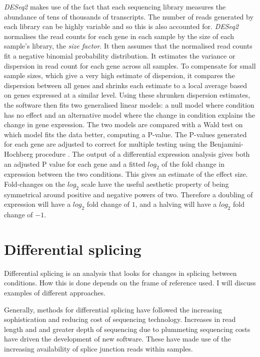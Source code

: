 \textit{DESeq2} makes use of the fact that each sequencing library measures the abundance of tens of thousands of transcripts. 
The number of reads generated by each library can be highly variable and so this is also accounted for. 
\textit{DESeq2} normalises the read counts for each gene in each sample by the size of each sample's library, the \textit{size factor}. 
It then assumes that the normalised read counts fit a negative binomial probability distribution. 
It estimates the variance or dispersion in read count for each gene across all samples. 
To compensate for small sample sizes, which give a very high estimate of dispersion, it compares the dispersion between all genes and shrinks each estimate to a local average based on genes expressed at a similar level. 
Using these shrunken dispersion estimates, the software then fits two generalised linear models: a null model where condition has no effect and an alternative model where the change in condition explains the change in gene expression. 
The two models are compared with a Wald test on which model fits the data better, computing a P-value. 
The P-values generated for each gene are adjusted to correct for multiple testing using the Benjamini-Hochberg procedure \citep{Benjamini1995}. 
The output of a differential expression analysis gives both an adjusted P value for each gene and a fitted $log_2$ of the fold change in expression between the two conditions. 
This gives an estimate of the effect size. 
Fold-changes on the $log_2$ scale have the useful aesthetic property of being symmetrical around positive and negative powers of two.
Therefore a doubling of expression will have a $log_2$ fold change of $1$, and a halving will have a $log_2$ fold change of $-1$.


\section{Differential splicing}

Differential splicing is an analysis that looks for changes in splicing between conditions. 
How this is done depends on the frame of reference used. 
I will discuss examples of different approaches.

Generally, methods for differential splicing have followed the increasing sophistication and reducing cost of sequencing technology.
Increases in read length and and greater depth of sequencing due to plummeting sequencing costs have driven the development of new software. These have  made use of the increasing availability of splice junction reads within samples.

